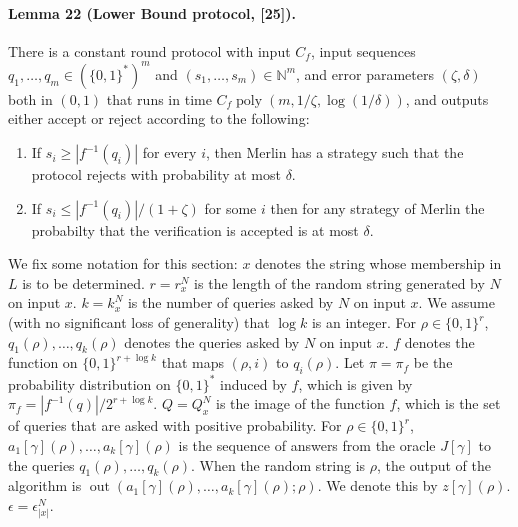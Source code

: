 \documentclass[10pt,a4paper]{article}
\begin{document}
\paragraph{Lemma 22 (Lower Bound protocol, [25]).} There is a constant round protocol with input $C_f$, input sequences $q_1,\ldots,q_m\in(\{0,1\}^*)^m$ and $(s_1,\ldots,s_m)\in\mathbb N^m$, and error parameters $(\zeta,\delta)$ both in $(0,1)$ that runs in time $C_f\operatorname{poly}(m,1/\zeta,\log(1/\delta))$, and outputs either accept or reject according to the following:
\begin{enumerate}\item If $s_i\ge|f^{-1}(q_i)|$ for every $i$, then Merlin has a strategy such that the protocol rejects with probability at most $\delta$.
\item If $s_i\le|f^{-1}(q_i)|/(1+\zeta)$ for some $i$ then for any strategy of Merlin the probabilty that the verification is accepted is at most $\delta$.\end{enumerate}
We fix some notation for this section: $x$ denotes the string whose membership in $L$ is to be determined. $r=r_x^N$ is the length of the random string generated by $N$ on input $x$. $k=k_x^N$ is the number of queries asked by $N$ on input $x$. We assume (with no significant loss of generality) that $\log k$ is an integer. For $\rho\in\{0,1\}^r$, $q_1(\rho),\ldots,q_k(\rho)$ denotes the queries asked by $N$ on input $x$. $f$ denotes the function on $\{0,1\}^{r+\log k}$ that maps $(\rho,i)$ to $q_i(\rho)$. Let $\pi=\pi_f$ be the probability distribution on $\{0,1\}^*$ induced by $f$, which is given by $\pi_f=|f^{-1}(q)|/2^{r+\log k}$. $Q=Q_x^N$ is the image of the function $f$, which is the set of queries that are asked with positive probability. For $\rho\in\{0,1\}^r$, $a_1[\gamma](\rho),\ldots,a_k[\gamma](\rho)$ is the sequence of answers from the oracle $J[\gamma]$ to the queries $q_1(\rho),\ldots,q_k(\rho)$. When the random string is $\rho$, the output of the algorithm is $\operatorname{out}(a_1[\gamma](\rho),\ldots,a_k[\gamma](\rho);\rho)$. We denote this by $z[\gamma](\rho)$. $\epsilon=\epsilon_{|x|}^N$.
\end{document}
